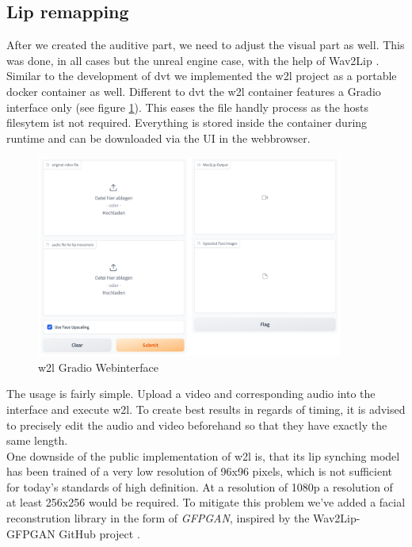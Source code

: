 \documentclass[
  a4paper,  %
  twoside,  %
  bibliography=totoc,
  headsepline,
  cleardoublepage=empty,
  parskip=half,
  draft=false
]{scrbook}
\begin{document}
\subsection{Lip remapping}
 After we created the auditive part, we need to adjust the visual part as well. This was done, in all cases but the unreal engine case, with the help of Wav2Lip \cite{mukhopadhyayWav2LipAccuratelyLipsyncing2023}. Similar to the development of \gls{dvt} we implemented the \gls{w2l} project as a portable docker container as well. Different to \gls{dvt} the \gls{w2l} container features a Gradio interface only (see figure \ref{fig:w2l-gradio}). This eases the file handly process as the hosts filesytem ist not required. Everything is stored inside the container during runtime and can be downloaded via the UI in the webbrowser.
 \begin{figure}[h]
  \centering
  \includegraphics[width=0.9\textwidth]{./graphics/images/wav2lip/w2l-gradio.png}
  \caption{\gls{w2l} Gradio Webinterface}
  \label{fig:w2l-gradio}
\end{figure}
The usage is fairly simple. Upload a video and corresponding audio into the interface and execute \gls{w2l}. To create best results in regards of timing, it is advised to precisely edit the audio and video beforehand so that they have exactly the same length. \\
One downside of the public implementation of \gls{w2l} is, that its lip synching model has been trained of a very low resolution of 96x96 pixels, which is not sufficient for today's standards of high definition. At a resolution of 1080p a resolution of at least 256x256 would be required. To mitigate this problem we've added a facial reconstrution library in the form of \textit{GFPGAN}, inspired by the Wav2Lip-GFPGAN GitHub project \cite{sainyAjaysainyWav2LipGFPGAN2023}. \\
\end{document}
